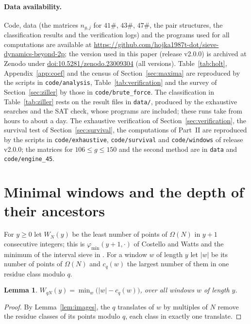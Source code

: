 \documentclass[11pt]{article}
\newtheorem{lemma}[theorem]{Lemma}
\theoremstyle{definition}
\theoremstyle{remark}
\begin{document}
\paragraph{Data availability.} Code, data (the matrices $n_{g,j}$ for $41\#$, $43\#$, $47\#$, the pair structures, the classification results and the verification logs) and the programs used for all computations are available at \url{https://github.com/hojka1987t-dot/sieve-dynamics-beyond-2p}; the version used in this paper (release v2.0.0) is archived at Zenodo under \href{https://doi.org/10.5281/zenodo.23009304}{doi:10.5281/zenodo.23009304} (all versions). Table~\ref{tab:holt}, Appendix~\ref{app:coef} and the census of Section~\ref{sec:maxima} are reproduced by the scripts in \texttt{code/analysis}, Table~\ref{tab:verification} and the survey of Section~\ref{sec:ziller} by those in \texttt{code/brute\_force}. The classification in Table~\ref{tab:ziller} rests on the result files in \texttt{data/}, produced by the exhaustive searches and the SAT check, whose programs are included; these runs take from hours to about a day. The exhaustive verification of Section~\ref{sec:verification}, the survival test of Section~\ref{sec:survival}, the computations of Part~II are reproduced by the scripts in \texttt{code/exhaustive}, \texttt{code/survival} and \texttt{code/windows} of release v2.0.0; the matrices for $106 \le g \le 150$ and the second method are in \texttt{data} and \texttt{code/engine\_45}.

\section{Minimal windows and the depth of their ancestors}\label{sec:depth}

For $y \ge 0$ let $W_N(y)$ be the least number of points of $\Omega(N)$ in $y + 1$ consecutive integers; this is $\varphi_{\min}(y+1, \cdot)$ of Costello and Watts \cite{CW15} and the minimum of the interval sieve in \cite{BFT23}. For a window $w$ of length $y$ let $|w|$ be its number of points of $\Omega(N)$ and $c_q(w)$ the largest number of them in one residue class modulo $q$.

\begin{lemma}\label{lem:window}
$W_{qN}(y) = \min_w \big(|w| - c_q(w)\big)$, over all windows $w$ of length $y$.
\end{lemma}

\begin{proof}
By Lemma~\ref{lem:images}, the $q$ translates of $w$ by multiples of $N$ remove the residue classes of its points modulo $q$, each class in exactly one translate.
\end{proof}
\end{document}
